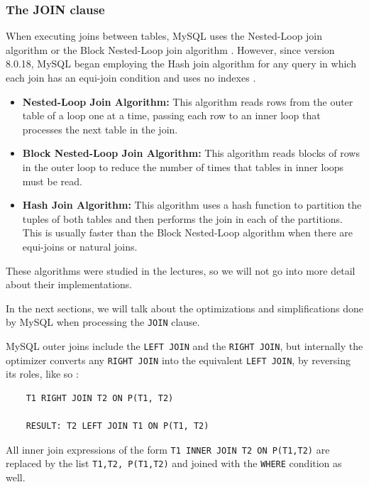 \documentclass[12pt]{article}
\newcounter{subsubsubsection}[subsubsection]
\begin{document}
\subsubsection{The JOIN clause}
\label{joinClause}
When executing joins between tables, MySQL uses the Nested-Loop join algorithm or the Block Nested-Loop join algorithm \parencite{NestLoopJoinAlgorithms}. However, since version 8.0.18, MySQL began employing the Hash join algorithm for any query in which each join has an equi-join condition and uses no indexes \parencite{HashJoinOptimization}.

\begin{itemize}
    \item \textbf{Nested-Loop Join Algorithm:} This algorithm reads rows from the outer table of a loop one at a time, passing each row to an inner loop that processes the next table in the join.

    \item \textbf{Block Nested-Loop Join Algorithm:} This algorithm reads blocks of rows in the outer loop to reduce the number of times that tables in inner loops must be read.

    \item \textbf{Hash Join Algorithm:} This algorithm uses a hash function to partition the tuples of both tables and then performs the join in each of the partitions. This is usually faster than the Block Nested-Loop algorithm when there are equi-joins or natural joins.
\end{itemize}

These algorithms were studied in the lectures, so we will not go into more detail about their implementations.

In the next sections, we will talk about the optimizations and simplifications done by MySQL when processing the \verb|JOIN| clause.


MySQL outer joins include the \verb|LEFT JOIN| and the \verb|RIGHT JOIN|, but internally the optimizer converts any \verb|RIGHT JOIN| into the equivalent \verb|LEFT JOIN|, by reversing its roles, like so \parencite{OuterJoinSimplification}:
\begin{verbatim}
    T1 RIGHT JOIN T2 ON P(T1, T2)

    RESULT: T2 LEFT JOIN T1 ON P(T1, T2)
\end{verbatim}

All inner join expressions of the form \verb|T1 INNER JOIN T2 ON P(T1,T2)| are replaced by the list \verb|T1,T2, P(T1,T2)| and joined with the \verb|WHERE| condition as well.
\end{document}
